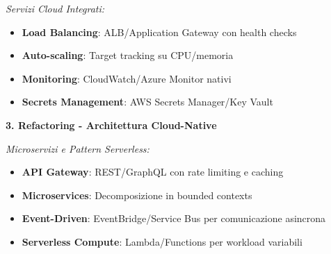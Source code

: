\textit{Servizi Cloud Integrati:}
\begin{itemize}
    \item \textbf{Load Balancing}: ALB/Application Gateway con health checks
    \item \textbf{Auto-scaling}: Target tracking su CPU/memoria
    \item \textbf{Monitoring}: CloudWatch/Azure Monitor nativi
    \item \textbf{Secrets Management}: AWS Secrets Manager/Key Vault
\end{itemize}

\textbf{3. Refactoring - Architettura Cloud-Native}

\textit{Microservizi e Pattern Serverless:}
\begin{itemize}
    \item \textbf{API Gateway}: REST/GraphQL con rate limiting e caching
    \item \textbf{Microservices}: Decomposizione in bounded contexts
    \item \textbf{Event-Driven}: EventBridge/Service Bus per comunicazione asincrona
    \item \textbf{Serverless Compute}: Lambda/Functions per workload variabili
\end{itemize}

